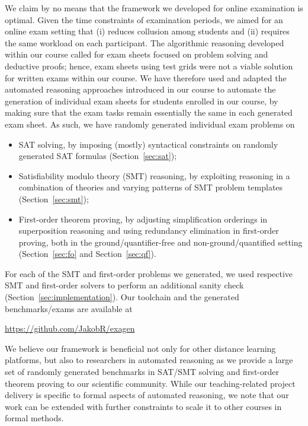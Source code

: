 We claim by no means that the framework we developed for online
examination is optimal.
Given the time constraints of examination periods, we aimed for an
online exam setting that (i) reduces collusion among students and  (ii)
requires the same workload on each participant.
The algorithmic reasoning developed within our
course called for exam sheets focused on problem solving and deductive
proofs; hence, exam sheets using test grids were not a viable solution
for written exams within our course.
We have therefore used and adapted the automated reasoning approaches introduced in our
course to automate the generation of individual exam sheets for
students enrolled in our course, by making sure that the exam tasks
remain essentially the same in each generated exam sheet. As such, we have randomly generated
individual exam problems on 
\begin{itemize}
\item
    SAT solving, by imposing (mostly) syntactical constraints on
    randomly generated SAT formulas (Section~\ref{sec:sat});
    
\item Satisfiability modulo theory (SMT) reasoning, by exploiting reasoning in a combination of theories
  and varying patterns of SMT problem templates
  (Section~\ref{sec:smt});
  
\item First-order theorem proving, by adjusting simplification
  orderings in superposition reasoning and using redundancy elimination
  in first-order proving, both in the ground/quantifier-free 
  and non-ground/quantified setting (Section~\ref{sec:fo}
  and Section~\ref{sec:qf}). 
\end{itemize}

For each of the SMT and first-order problems we generated, we used respective
SMT and first-order solvers to perform an additional sanity check
(Section~\ref{sec:implementation}).
Our toolchain and the generated benchmarks/exams are available at

\begin{center}
  \url{https://github.com/JakobR/exagen}
\end{center}

We believe our framework is beneficial not only for other
distance learning platforms, but also to researchers in automated
reasoning as we provide a large set of randomly generated benchmarks
in SAT/SMT solving and first-order theorem proving
to our scientific community.
While our teaching-related project delivery is specific to formal aspects of automated
reasoning, we note that our work can be extended with further
constraints to scale it to other courses in formal methods. 

